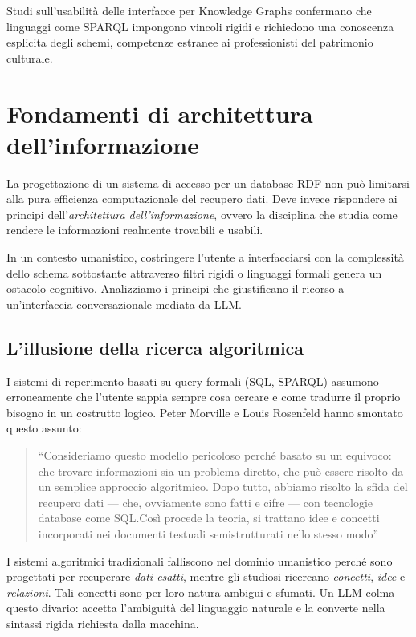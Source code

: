 Studi sull'usabilità delle interfacce per Knowledge Graphs confermano che linguaggi come SPARQL impongono vincoli rigidi e richiedono una conoscenza esplicita degli schemi, competenze estranee ai professionisti del patrimonio culturale\cite{Vas25}.
\newpage
\section{Fondamenti di architettura dell'informazione}\label{sec:archinfo}
La progettazione di un sistema di accesso per un database RDF non può limitarsi alla pura efficienza computazionale del recupero dati. Deve invece rispondere ai principi dell'\textit{architettura dell'informazione}, ovvero la disciplina che studia come rendere le informazioni realmente trovabili e usabili.

In un contesto umanistico, costringere l'utente a interfacciarsi con la complessità dello schema sottostante attraverso filtri rigidi o linguaggi formali genera un ostacolo cognitivo.
Analizziamo i principi che giustificano il ricorso a un'interfaccia conversazionale mediata da LLM.\@

    \subsection{L'illusione della ricerca algoritmica}\label{subsec:illusione}

    I sistemi di reperimento basati su query formali (SQL, SPARQL) assumono erroneamente che l'utente sappia sempre cosa cercare e come tradurre il proprio bisogno in un costrutto logico. Peter Morville e Louis Rosenfeld hanno smontato questo assunto:

    \begin{quotation}
    ``Consideriamo questo modello pericoloso perché basato su un equivoco: che trovare informazioni sia un problema diretto, che può essere risolto da un semplice approccio algoritmico. Dopo tutto, abbiamo risolto la sfida del recupero dati --- che, ovviamente sono fatti e cifre --- con tecnologie database come SQL.\@ Così procede la teoria, si trattano idee e concetti incorporati nei documenti testuali semistrutturati nello stesso modo''\hfill\cite{Mor08}
    \end{quotation}

    I sistemi algoritmici tradizionali falliscono nel dominio umanistico perché sono progettati per recuperare \textit{dati esatti}, mentre gli studiosi ricercano \textit{concetti}, \textit{idee} e \textit{relazioni}. Tali concetti sono per loro natura ambigui e sfumati. Un LLM colma questo divario: accetta l'ambiguità del linguaggio naturale e la converte nella sintassi rigida richiesta dalla macchina.

